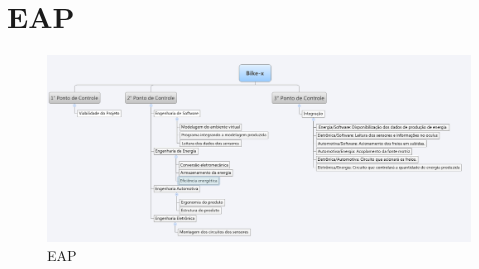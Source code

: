 \chapter[EAP]{EAP}

\begin{figure}[h]
  \centering
  \includegraphics[width=1.2\textwidth, angle =90 ]
      {figuras/bike-x2.eps}
  \caption{EAP}
  \label{EAP}
\end{figure}
